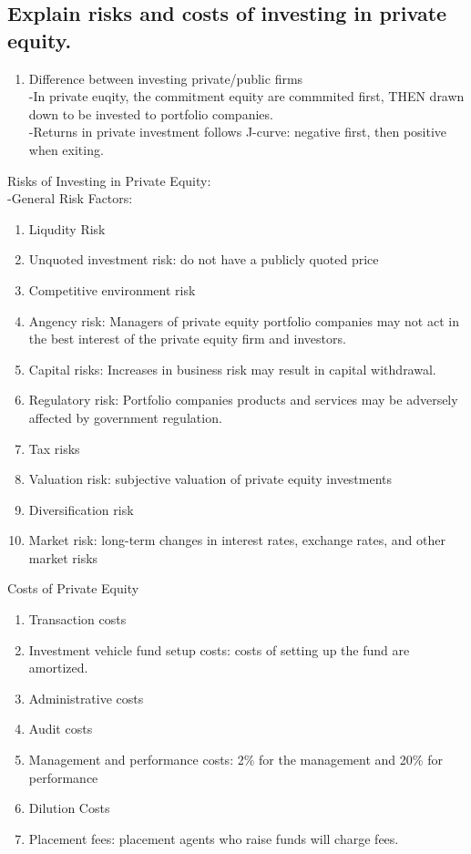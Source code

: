 \documentclass{article}
\newcommand{\be}{\begin{enumerate}}
\newcommand{\ee}{\end{enumerate}}
\begin{document}
\subsection{Explain risks and costs of investing in private equity.
}
\be
    \item Difference between investing private/public firms
    \\-In private euqity, the commitment equity are commmited first, THEN drawn down
    to be invested to portfolio companies.
    \\-Returns in private investment follows J-curve: negative first, then positive when
    exiting.
\ee
Risks of Investing in Private Equity:
\\-General Risk Factors:
\be
    \item Liqudity Risk
    \item Unquoted investment risk: do not have a publicly quoted price
    \item Competitive environment risk
    \item Angency risk: Managers of private equity portfolio companies may not act in the
    best interest of the private equity firm and investors.
    \item Capital risks: Increases in business risk may result in capital withdrawal.
    \item Regulatory risk: Portfolio companies products and services may be adversely affected by government regulation.
    \item Tax risks
    \item Valuation risk: subjective valuation of private equity investments
    \item Diversification risk
    \item Market risk: long-term changes in interest rates, exchange rates, and other market risks
\ee
Costs of Private Equity
\be
    \item Transaction costs
    \item Investment vehicle fund setup costs: costs of setting up the fund are amortized.
    \item Administrative costs
    \item Audit costs
    \item Management and performance costs: 2\% for the management and 20\% for performance
    \item Dilution Costs
    \item Placement fees: placement agents who raise funds will charge fees.
\ee
\end{document}
